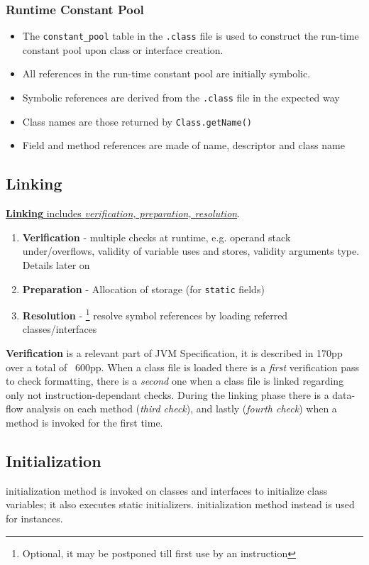 \subsubsection{Runtime Constant Pool}

\begin{itemize}
	\item The \lstinline|constant_pool| table in the \texttt{.class} file is
	      used to construct the run-time constant pool
	      upon class or interface creation.
	\item All references in the run-time constant pool are
	      initially symbolic.
	\item Symbolic references are derived from
	      the \texttt{.class} file in the expected way
	\item Class names are those returned by
	      \lstinline|Class.getName()|
	\item Field and method references are made of name,
	      descriptor and class name
\end{itemize}

\subsection{Linking}
\ul{\textbf{Linking} includes \textit{verification, preparation, resolution}}.
\begin{enumerate}
    \item \textbf{Verification} -  multiple checks at runtime, e.g. operand stack under/overflows, validity of variable uses and stores, validity arguments type.
    Details later on
    \item \textbf{Preparation} -  Allocation of storage (for \texttt{static} fields) 
    \item \textbf{Resolution} - \footnote{Optional, it may be postponed till first use by an instruction} resolve symbol references by loading referred classes/interfaces
\end{enumerate}

\textbf{Verification} is a relevant part of JVM Specification, it is described in 170pp over a total of ~600pp.
When a class file is loaded there is a \textit{first} verification pass to check formatting, 
there is a \textit{second} one when a class file is linked regarding only not instruction-dependant checks.
During the linking phase there is a data-flow analysis on each method (\textit{third check}),
and lastly (\textit{fourth check}) when a method is invoked for the first time.

\subsection{Initialization}
 initialization method is invoked on classes
and interfaces to initialize class variables;
it also executes static initializers.
 initialization method instead is used for instances.

